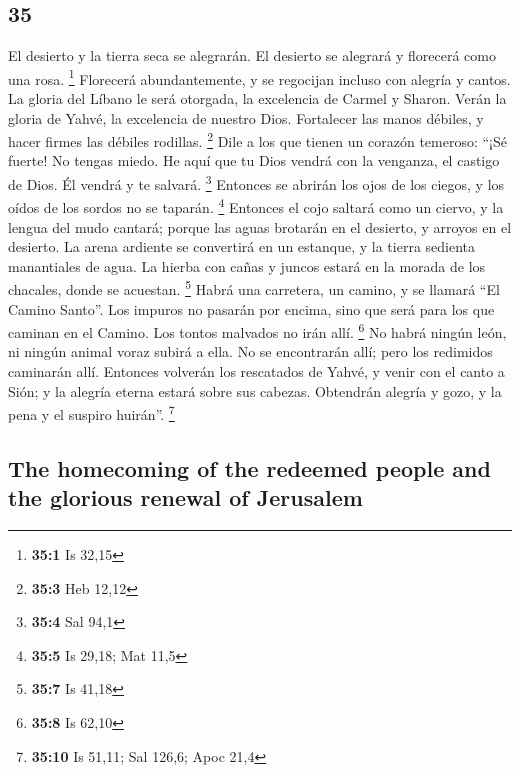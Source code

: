 \begin{paracol}{2}
\hypertarget{section-68}{%
\section{35}\label{section-68}}

 El desierto y la tierra seca se alegrarán. El desierto se
alegrará y florecerá como una rosa. \footnote{\textbf{35:1} Is 32,15}
 Florecerá abundantemente, y se regocijan incluso con
alegría y cantos. La gloria del Líbano le será otorgada, la excelencia
de Carmel y Sharon. Verán la gloria de Yahvé, la excelencia de nuestro
Dios.  Fortalecer las manos débiles, y hacer firmes las
débiles rodillas. \footnote{\textbf{35:3} Heb 12,12}  Dile
a los que tienen un corazón temeroso: ``¡Sé fuerte! No tengas miedo. He
aquí que tu Dios vendrá con la venganza, el castigo de Dios. Él vendrá y
te salvará. \footnote{\textbf{35:4} Sal 94,1}  Entonces se
abrirán los ojos de los ciegos, y los oídos de los sordos no se taparán.
\footnote{\textbf{35:5} Is 29,18; Mat 11,5}  Entonces el
cojo saltará como un ciervo, y la lengua del mudo cantará; porque las
aguas brotarán en el desierto, y arroyos en el desierto. 
La arena ardiente se convertirá en un estanque, y la tierra sedienta
manantiales de agua. La hierba con cañas y juncos estará en la morada de
los chacales, donde se acuestan. \footnote{\textbf{35:7} Is 41,18}
 Habrá una carretera, un camino, y se llamará ``El Camino
Santo''. Los impuros no pasarán por encima, sino que será para los que
caminan en el Camino. Los tontos malvados no irán allí. \footnote{\textbf{35:8}
  Is 62,10}  No habrá ningún león, ni ningún animal voraz
subirá a ella. No se encontrarán allí; pero los redimidos caminarán
allí.  Entonces volverán los rescatados de Yahvé, y venir
con el canto a Sión; y la alegría eterna estará sobre sus cabezas.
Obtendrán alegría y gozo, y la pena y el suspiro huirán''. \footnote{\textbf{35:10}
  Is 51,11; Sal 126,6; Apoc 21,4}

\switchcolumn
\begin{otherlanguage}{english}

\hypertarget{the-homecoming-of-the-redeemed-people-and-the-glorious-renewal-of-jerusalem}{%
\subsection{The homecoming of the redeemed people and the glorious
renewal of
Jerusalem}\label{the-homecoming-of-the-redeemed-people-and-the-glorious-renewal-of-jerusalem}}


\end{otherlanguage}
\end{paracol}
